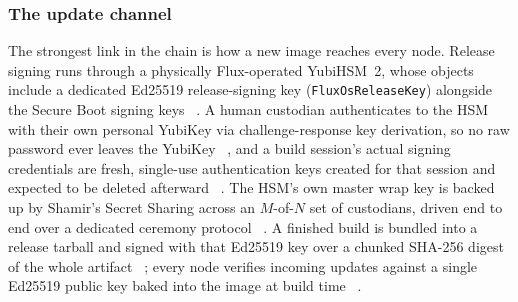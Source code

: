 \subsubsection{The update channel}
\label{sec:update-channel}

The strongest link in the chain is how a new \ArcaneOS image reaches every node. Release signing
runs through a physically Flux-operated YubiHSM~2, whose objects include a dedicated Ed25519
release-signing key (\texttt{Flux\allowbreak{}Os\allowbreak{}Release\allowbreak{}Key}) alongside the Secure Boot signing keys
\shipped~. A human custodian
authenticates to the HSM with their own personal YubiKey via challenge-response key derivation, so
no raw password ever leaves the YubiKey \shipped~,
and a build session's actual signing credentials are fresh, single-use authentication keys created
for that session and expected to be deleted afterward
\shipped~. The HSM's own master
wrap key is backed up by Shamir's Secret Sharing across an $M$-of-$N$ set of custodians, driven end
to end over a dedicated ceremony protocol
\shipped~. A finished build is bundled
into a release tarball and signed with that Ed25519 key over a chunked SHA-256 digest of the whole
artifact \shipped~;
every node verifies incoming updates against a single Ed25519 public key baked into the image at
build time \shipped~.


